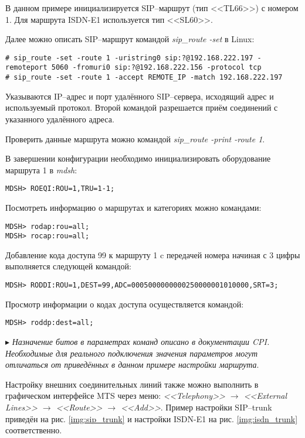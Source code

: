 В данном примере инициализируется SIP--маршрут (тип <<TL66>>) с номером 1. Для маршрута ISDN-E1 используется тип <<SL60>>. 

Далее можно описать SIP--маршрут командой {\em sip\_route -set} в Linux: 
\begin{lstlisting}
# sip_route -set -route 1 -uristring0 sip:?@192.168.222.197 -remoteport 5060 -fromuri0 sip:?@192.168.222.156 -protocol tcp
# sip_route -set -route 1 -accept REMOTE_IP -match 192.168.222.197
\end{lstlisting}
Указываются IP--адрес и порт удалённого SIP--сервера, исходящий адрес и используемый протокол. Второй командой разрешается приём соединений с указанного удалённого адреса.

Проверить данные маршрута можно командой {\em sip\_route -print -route 1}.

В завершении конфигурации необходимо инициализировать оборудование маршрута 1 в {\em mdsh}:
\begin{lstlisting}
MDSH> ROEQI:ROU=1,TRU=1-1;
\end{lstlisting}

Посмотреть информацию о маршрутах и категориях можно командами: 
\begin{lstlisting}
MDSH> rodap:rou=all;
MDSH> rocap:rou=all;
\end{lstlisting}

Добавление кода доступа 99 к маршруту 1 c передачей номера начиная с 3 цифры выполняется следующей командой:
\begin{lstlisting}
MDSH> RODDI:ROU=1,DEST=99,ADC=0005000000000250000001010000,SRT=3;
\end{lstlisting}

Просмотр информации о кодах доступа осуществляется командой:
\begin{lstlisting}
MDSH> roddp:dest=all;  
\end{lstlisting}

$\blacktriangleright$ {\em Назначение битов в параметрах команд описано в документации CPI. Необходимые для реального подключения значения параметров могут отличаться от приведённых в данном примере настройки маршрута}. 

Настройку внешних соединительных линий также можно выполнить в графическом интерфейсе MTS через меню: {\em <<Telephony>> $\rightarrow$ <<External Lines>> $\rightarrow$ <<Route>> $\rightarrow$ <<Add>>}. Пример настройки SIP--trunk приведён на рис. \ref{img:sip_trunk} и настройки ISDN-E1 на рис. \ref{img:isdn_trunk} соответственно.


